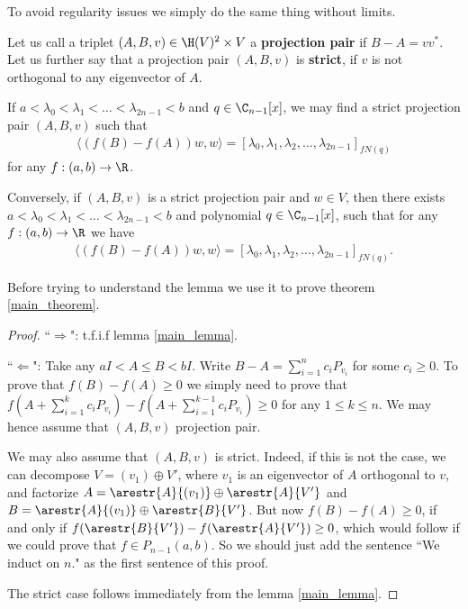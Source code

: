 To avoid regularity issues we simply do the same thing without limits.

\begin{maar}
	Let us call a triplet $(A, B, v) \in \H(V)^{2} \times V$ a \textbf{projection pair} if $B - A = v v^{*}$. Let us further say that a projection pair $(A, B, v)$ is \textbf{strict}, if $v$ is not orthogonal to any eigenvector of $A$. 
\end{maar}

\begin{lem}\label{main_lemma}
	If $a < \lambda_{0} < \lambda_{1} < \ldots < \lambda_{2 n - 1} < b$ and $q \in \C_{n - 1}[x]$, we may find a strict projection pair $(A, B, v)$ such that
	\begin{align*}
		\langle (f(B) - f(A)) w, w \rangle = [\lambda_{0}, \lambda_{1}, \lambda_{2}, \ldots, \lambda_{2 n - 1}]_{f N(q)}
	\end{align*}
	for any $f : (a, b) \to \R$.

	Conversely, if $(A, B, v)$ is a strict projection pair and $w \in V$, then there exists $a < \lambda_{0} < \lambda_{1} < \ldots < \lambda_{2 n - 1} < b$ and polynomial $q \in \C_{n - 1}[x]$, such that for any $f : (a, b) \to \R$ we have
	\begin{align*}
		\langle (f(B) - f(A)) w, w \rangle = [\lambda_{0}, \lambda_{1}, \lambda_{2}, \ldots, \lambda_{2 n - 1}]_{f N(q)}.
	\end{align*}
\end{lem}

Before trying to understand the lemma we use it to prove theorem \ref{main_theorem}.

\begin{proof}
	``$\Rightarrow$": t.f.i.f lemma \ref{main_lemma}.

	``$\Leftarrow$": Take any $a I < A \leq B < b I$. Write $B - A = \sum_{i = 1}^{n} c_{i} P_{v_{i}}$ for some $c_{i} \geq 0$. To prove that $f(B) - f(A) \geq 0$ we simply need to prove that $f(A + \sum_{i = 1}^{k} c_{i} P_{v_{i}}) - f(A + \sum_{i = 1}^{k - 1} c_{i} P_{v_{i}}) \geq 0$ for any $1 \leq k \leq n$. We may hence assume that $(A, B, v)$ projection pair.

	We may also assume that $(A, B, v)$ is strict. Indeed, if this is not the case, we can decompose $V = (v_{1}) \oplus V'$, where $v_{1}$ is an eigenvector of $A$ orthogonal to $v$, and factorize $A = \arestr{A}{(v_{1})} \oplus \arestr{A}{V'}$ and $B = \arestr{A}{(v_{1})} \oplus \arestr{B}{V'}$. But now $f(B) - f(A) \geq 0$, if and only if $f(\arestr{B}{V'}) - f(\arestr{A}{V'}) \geq 0$, which would follow if we could prove that $f \in P_{n - 1}(a, b)$. So we should just add the sentence ``We induct on $n$." as the first sentence of this proof.

	The strict case follows immediately from the lemma \ref{main_lemma}.
\end{proof}

